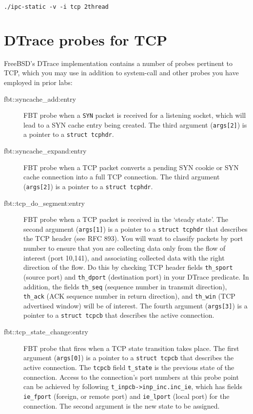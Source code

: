 \documentclass[a4paper,10pt]{article}
\begin{document}
\begin{verbatim}
./ipc-static -v -i tcp 2thread
\end{verbatim}

\section*{DTrace probes for TCP}

FreeBSD's DTrace implementation contains a number of probes pertinent to TCP,
which you may use in addition to system-call and other probes you have
employed in prior labs:

\begin{description}
\item[fbt::syncache\_add:entry] FBT probe when a \texttt{SYN} packet is
  received for a listening socket, which will lead to a SYN cache entry being
  created.
  The third argument (\texttt{args[2]}) is a pointer to a \texttt{struct
  tcphdr}.

\item[fbt::syncache\_expand:entry] FBT probe when a TCP packet converts a
  pending SYN cookie or SYN cache connection into a full TCP connection.
  The third argument (\texttt{args[2]}) is a pointer to a \texttt{struct
  tcphdr}.

\item[fbt::tcp\_do\_segment:entry] FBT probe when a TCP packet is received in
  the `steady state'.
  The second argument (\texttt{args[1]}) is a pointer to a \texttt{struct
  tcphdr} that describes the TCP header (see RFC 893).
  You will want to classify packets by port number to ensure that you are
  collecting data only from the flow of interest (port 10,141), and
  associating collected data with the right direction of the flow.
  Do this by checking TCP header fields \texttt{th\_sport} (source port) and
  \texttt{th\_dport} (destination port) in your DTrace predicate.
  In addition, the fields \texttt{th\_seq} (sequence number in transmit
  direction), \texttt{th\_ack} (ACK sequence number in return direction), and
  \texttt{th\_win} (TCP advertised window) will be of interest.
  The fourth argument (\texttt{args[3]}) is a pointer to a \texttt{struct
  tcpcb} that describes the active connection.

\item[fbt::tcp\_state\_change:entry] FBT probe that fires when a TCP state
  transition takes place.
  The first argument (\texttt{args[0]}) is a pointer to a \texttt{struct
  tcpcb} that describes the active connection.
  The \texttt{tcpcb} field \texttt{t\_state} is the previous state of the
  connection.
  Access to the connection's port numbers at this probe point can be
  achieved by following \texttt{t\_inpcb->inp\_inc.inc\_ie}, which
  has fields \texttt{ie\_fport} (foreign, or remote port) and
  \texttt{ie\_lport} (local port) for the connection.
  The second argument is the new state to be assigned.
\end{description}
\end{document}
